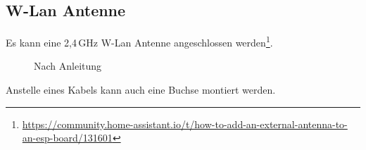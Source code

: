 \documentclass[ngerman,11pt,parskip=half] {scrartcl}
\begin{document}
\subsection{W-Lan Antenne}

Es kann eine 2,4\,GHz W-Lan Antenne angeschlossen werden\footnote{\url{https://community.home-assistant.io/t/how-to-add-an-external-antenna-to-an-esp-board/131601}}.  

\begin{figure}[H]
\centering
{}
\hspace{1cm} %
\caption{Nach Anleitung} \label{fig:1}
\end{figure}

Anstelle eines Kabels kann auch eine Buchse montiert werden.
\end{document}
